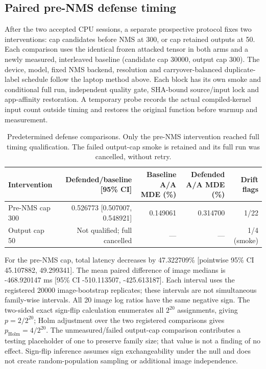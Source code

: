 \subsection{Paired pre-NMS defense timing}
\label{app:seg-laptop-defense}
After the two accepted CPU sessions, a separate prospective protocol fixes two interventions: cap candidates before NMS at 300, or cap retained outputs at 50. Each comparison uses the identical frozen attacked tensor in both arms and a newly measured, interleaved baseline (candidate cap 30000, output cap 300). The device, model, fixed NMS backend, resolution and carryover-balanced duplicate-label schedule follow the laptop method above. Each block has its own smoke and conditional full run, independent quality gate, SHA-bound source/input lock and app-affinity restoration. A temporary probe records the actual compiled-kernel input count outside timing and restores the original function before warmup and measurement.
\begin{table}[t]\centering
\caption{Predetermined defense comparisons. Only the pre-NMS intervention reached full timing qualification. The failed output-cap smoke is retained and its full run was cancelled, without retry.}
\label{tab:seg-laptop-defense}
\begin{tabular}{lrrrr}\toprule
Intervention & Defended/baseline [95\% CI] & Baseline A/A MDE (\%) & Defended A/A MDE (\%) & Drift flags\\\midrule
Pre-NMS cap 300 & 0.526773 [0.507007, 0.548921] & 0.149061 & 0.314700 & 1/22 \\
Output cap 50 & Not qualified; full cancelled & --- & --- & 1/4 (smoke) \\
\bottomrule\end{tabular}\end{table}
For the pre-NMS cap, total latency decreases by 47.322709\% [pointwise 95\% CI 45.107882, 49.299341]. The mean paired difference of image medians is -468.920147 ms [95\% CI -510.113507, -425.613187]. Each interval uses the registered 20000 image-bootstrap replicates; these intervals are not simultaneous family-wise intervals.
All 20 image log ratios have the same negative sign. The two-sided exact sign-flip calculation enumerates all $2^{20}$ assignments, giving $p=2/2^{20}$; Holm adjustment over the two registered comparisons gives $p_{\mathrm{Holm}}=4/2^{20}$. The unmeasured/failed output-cap comparison contributes a testing placeholder of one to preserve family size; that value is not a finding of no effect. Sign-flip inference assumes sign exchangeability under the null and does not create random-population sampling or additional image independence.
